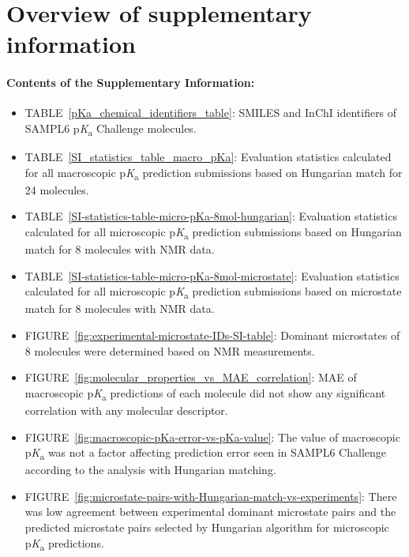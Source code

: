 \documentclass[9pt,lineno,final]{elife}
\newcommand{\pKa}{p\textit{K}\textsubscript{a}}
\begin{document}
\section{Overview of supplementary information}

\paragraph{Contents of the Supplementary Information:}

\begin{itemize}
\item TABLE~\ref{pKa_chemical_identifiers_table}: SMILES and InChI identifiers of SAMPL6 \pKa{}  Challenge molecules.
\item TABLE~\ref{SI_statistics_table_macro_pKa}: Evaluation statistics calculated for all macroscopic \pKa{} prediction submissions based on Hungarian match for 24 molecules.
\item TABLE~\ref{SI-statistics-table-micro-pKa-8mol-hungarian}: Evaluation statistics calculated for all microscopic \pKa{} prediction submissions based on Hungarian match for 8 molecules with NMR data.
\item TABLE~\ref{SI-statistics-table-micro-pKa-8mol-microstate}: Evaluation statistics calculated for all microscopic \pKa{} prediction submissions based on microstate match for 8 molecules with NMR data.
\item FIGURE~\ref{fig:experimental-microstate-IDs-SI-table}: Dominant microstates of 8 molecules were determined based on NMR measurements.
\item FIGURE~\ref{fig:molecular_properties_vs_MAE_correlation}: MAE of macroscopic \pKa{} predictions of each molecule did not show any significant correlation with any molecular descriptor.
\item FIGURE~\ref{fig:macroscopic-pKa-error-vs-pKa-value}: The value of macroscopic \pKa{} was not a factor affecting prediction error seen in SAMPL6 Challenge according to the analysis with Hungarian matching.
\item FIGURE~\ref{fig:microstate-pairs-with-Hungarian-match-vs-experiments}: There was low agreement between experimental dominant microstate pairs and the predicted microstate pairs selected by Hungarian algorithm for microscopic \pKa{} predictions. 




\end{itemize}
\end{document}
